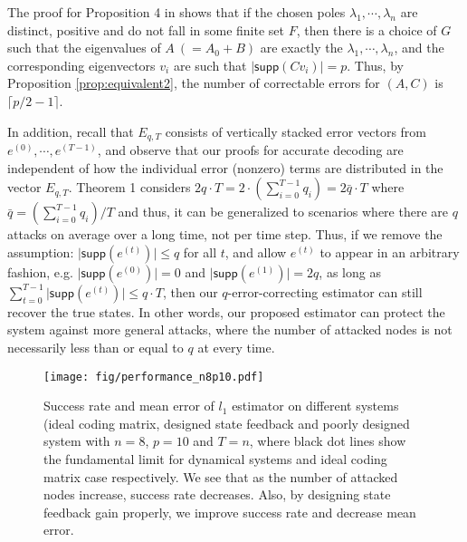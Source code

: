 \documentclass[twocolumn]{autart}    %
\newcommand{\rev}[1]{{\normalsize{{{\color{blue}#1}}}}}
\begin{document}
\vspace{-0.4cm}
\begin{pf}
The proof for Proposition 4 in \cite{Fawzi2014} shows that if the chosen poles $\lambda_1, \cdots, \lambda_n$ are distinct, positive and do not fall in some finite set $F$, then there is a choice of $G$ such that the eigenvalues of $A~(=A_0+B)$ are exactly the $\lambda_1, \cdots, \lambda_n$, and the corresponding eigenvectors $v_i$ are such that $\lvert \textsf{supp} (C v_i) \rvert = p$. Thus, by Proposition \ref{prop:equivalent2}, the number of correctable errors for $(A,C)$ is $\lceil p/2-1 \rceil$.
\end{pf}
\vspace{-0.6cm}
In addition, recall that $E_{q,T}$ consists of vertically stacked error vectors from $e^{(0)}, \cdots, e^{(T-1)}$, and observe that our proofs for accurate decoding are independent of how the individual error (nonzero) terms are distributed in the vector $E_{q,T}$. \rev{\rev{In particular,} %
Theorem 1 considers $2 q \cdot T = 2 \cdot (\sum_{i=0}^{T-1} q_i) = 2 \bar q \cdot T$ where $\bar q = (\sum_{i=0}^{T-1} q_i ) /T$ and thus, it can be generalized \rev{to scenarios where there are} $q$ attacks on average over a long time, not per time step.
}
Thus, if we remove the assumption: $\lvert \textsf{supp} (e^{(t)}) \rvert \le q$ for all $t$, and allow $e^{(t)}$ to appear in an arbitrary fashion, e.g. $\lvert \textsf{supp} (e^{(0)}) \rvert = 0$ and $\lvert \textsf{supp} (e^{(1)}) \rvert = 2q$, as long as $\sum_{t=0}^{T-1} \lvert \textsf{supp} (e^{(t)}) \rvert \leq q\cdot T$, then our $q$-error-correcting \rev{estimator} can still recover the true states. In other words, our proposed \rev{estimator} can protect the system against more general attacks, where the number of attacked nodes is not necessarily less than or equal to $q$ at every time.
\begin{figure*}[!t]
\center
\texttt{[image: fig/performance\_n8p10.pdf]}
\caption{Success rate and mean error of $l_1$ \rev{estimator} on different systems (ideal coding matrix, designed state feedback and poorly designed system with $n=8$, $p=10$ and $T=n$, where black dot lines show the fundamental limit for dynamical systems and ideal coding matrix case respectively. We see that as the number of attacked nodes increase, success rate decreases. Also, by designing state feedback gain properly, we improve success rate and decrease mean error. }
\label{fig:ex_n8p10}
\end{figure*}
\vspace{-0.4cm}
\end{document}
